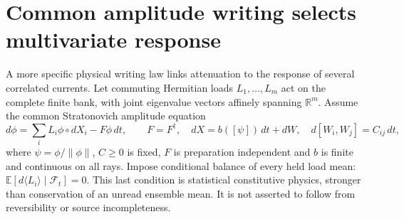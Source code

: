 \documentclass[11pt,oneside,openany]{book}
\theoremstyle{definition}
\theoremstyle{remark}\newtheorem{remark}[theorem]{Remark}
\begin{document}
\section{Common amplitude writing selects multivariate response}

A more specific physical writing law links attenuation to the response of several correlated currents. Let commuting Hermitian loads $L_1,\ldots,L_m$ act on the complete finite bank, with joint eigenvalue vectors affinely spanning $\mathbb R^m$. Assume the common Stratonovich amplitude equation
\begin{equation}
 d\phi=\sum_i L_i\phi\circ dX_i-F\phi\,dt,\qquad F=F^\dagger,
 \quad dX=b([\psi])\,dt+dW,\quad d[W_i,W_j]=C_{ij}\,dt,
 \label{cpc:eq:multiwriting}
\end{equation}
where $\psi=\phi/\|\phi\|$, $C\ge0$ is fixed, $F$ is preparation independent and $b$ is finite and continuous on all rays. Impose conditional balance of every held load mean: $\mathbb E[d\langle L_i\rangle\mid\mathcal F_t]=0$. This last condition is statistical constitutive physics, stronger than conservation of an unread ensemble mean. It is not asserted to follow from reversibility or source incompleteness.
\end{document}
